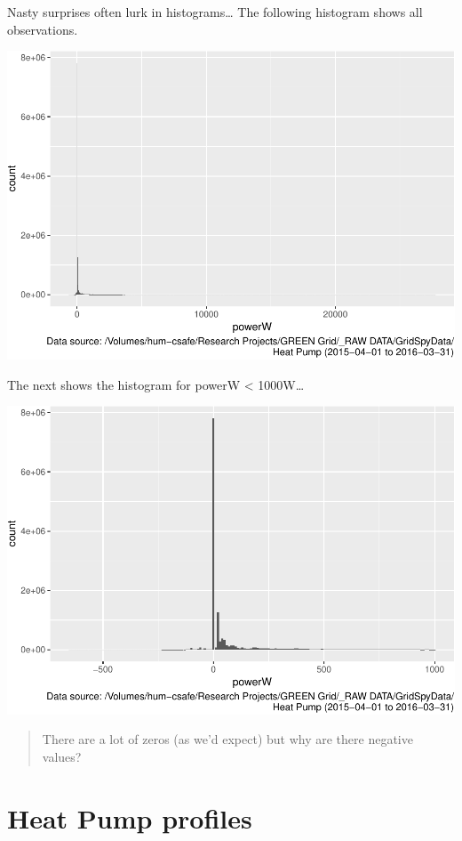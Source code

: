 \documentclass[]{article}
\begin{document}
Nasty surprises often lurk in histograms\ldots{} The following histogram
shows all observations.

\includegraphics{nzGGHouseholdPowerDemandProfile_Heat Pump_2015-04-01_2016-03-31_files/figure-latex/histo full-1.pdf}

The next shows the histogram for powerW \textless{} 1000W\ldots{}

\includegraphics{nzGGHouseholdPowerDemandProfile_Heat Pump_2015-04-01_2016-03-31_files/figure-latex/histo power under 1000-1.pdf}

\begin{quote}
There are a lot of zeros (as we'd expect) but why are there negative
values?
\end{quote}

\section{Heat Pump profiles}\label{heat-pump-profiles}
\end{document}
